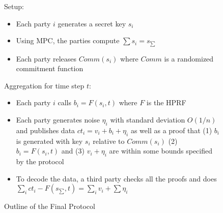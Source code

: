 \documentclass[11pt]{article}
\begin{document}
\begin{figure}[H]
	\begin{mdframed}
		Setup: \begin{itemize}
			\item Each party $i$ generates a secret key $s_i$
			\item Using MPC, the parties compute $\sum s_i = s_{\sum}$
			\item Each party releases $Comm(s_i)$ where $Comm$ is a randomized commitment function
		\end{itemize}
		Aggregation for time step $t$: \begin{itemize}
			\item Each party $i$ calls $b_i = F(s_i, t)$  where $F$ is the HPRF
			\item Each party generates noise $\eta_i$ with standard deviation $O(1/n)$ and publishes data $ct_i = v_i + b_i + \eta_i$ as well as a proof that (1) $b_i$ is generated with key $s_i$ relative to $Comm(s_i)$ (2) $b_i = F(s_i, t)$ and (3) $v_i + \eta_i$ are within some bounds specified by the protocol
			\item To decode the data, a third party checks all the proofs and does $\sum_i ct_i - F(s_{\sum}, t) = \sum_i v_i + \sum \eta_i$
		\end{itemize}
	\end{mdframed}
	\caption{Outline of the Final Protocol}
	\label{fig:prot}
\end{figure}




\end{document}
